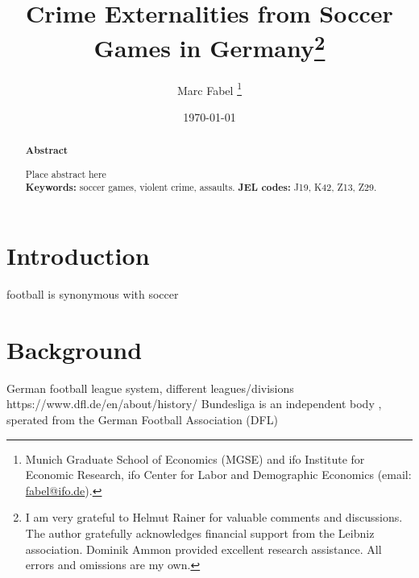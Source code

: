 \documentclass[11pt, a4paper]{article} %
\title{Crime Externalities from Soccer Games in Germany\footnote{I am very grateful to Helmut Rainer for valuable comments and discussions. The author gratefully acknowledges financial support from the Leibniz association. Dominik Ammon provided excellent research assistance. All errors and omissions are my own.
}}
\author{
	Marc Fabel 
		\thanks{Munich Graduate School of Economics (MGSE) and ifo Institute for Economic Research, ifo Center for Labor and Demographic Economics (email: \href{mailto:fabel@ifo.de}{fabel@ifo.de}).
		}
}
\date{\monthyeardate\today}
\begin{document}
\setcounter{page}{0}
\newpage
\setcounter{page}{1}
\maketitle


\renewcommand{\abstractname}{\vspace{-\baselineskip}} %
\begin{abstract}\noindent 
	\footnotesize{\begin{center}\textbf{Abstract}\end{center} Place abstract here\\\newline \textbf{Keywords:} soccer games, violent crime, assaults. \newline \textbf{JEL codes:} J19, K42, Z13, Z29.}

\end{abstract}


\newpage
\tableofcontents


\section{Introduction}\label{sec_soc_ext:introduction}


football is synonymous with soccer 



\bigskip
\section{Background}\label{sec_soc_ext:background}

German football league system, different leagues/divisions
https://www.dfl.de/en/about/history/
Bundesliga is an independent body , sperated from the German Football Association (DFL)

\end{document}
